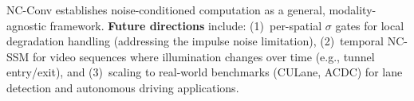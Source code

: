 \documentclass{bmvc2k}
\begin{document}
NC-Conv establishes noise-conditioned computation as a general, modality-agnostic framework.
\textbf{Future directions} include: (1)~per-spatial $\sigma$ gates for local degradation handling (addressing the impulse noise limitation), (2)~temporal NC-SSM for video sequences where illumination changes over time (e.g., tunnel entry/exit), and (3)~scaling to real-world benchmarks (CULane, ACDC) for lane detection and autonomous driving applications.


\end{document}
